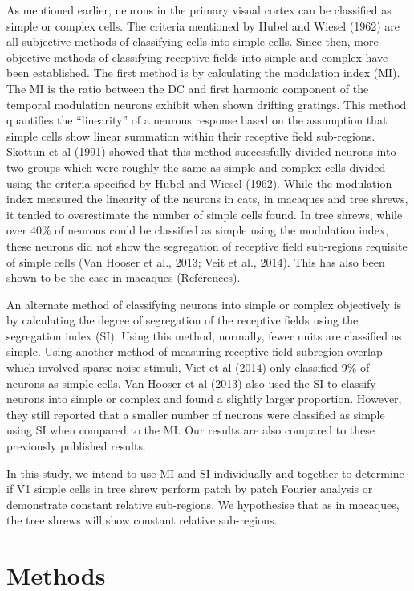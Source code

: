 	As mentioned earlier, neurons in the primary visual cortex can be classified as simple or complex cells. The criteria mentioned by Hubel and Wiesel (1962) are all subjective methods of classifying cells into simple cells. Since then, more objective methods of classifying receptive fields into simple and complex have been established. The first method is by calculating the modulation index (MI). The MI is the ratio between the DC and first harmonic component of the temporal modulation neurons exhibit when shown drifting gratings. This method quantifies the “linearity” of a neurons response based on the assumption that simple cells show linear summation within their receptive field sub-regions. Skottun et al (1991) showed that this method successfully divided neurons into two groups which were roughly the same as simple and complex cells divided using the criteria specified by Hubel and Wiesel (1962).
	While the modulation index measured the linearity of the neurons in cats, in macaques and tree shrews, it tended to overestimate the number of simple cells found. In tree shrews, while over 40\% of neurons could be classified as simple using the modulation index, these neurons did not show the segregation of receptive field sub-regions requisite of simple cells (Van Hooser et al., 2013; Veit et al., 2014). This has also been shown to be the case in macaques (References). 
	
	An alternate method of classifying neurons into simple or complex objectively is by calculating the degree of segregation of the receptive fields using the segregation index (SI). Using this method, normally, fewer units are classified as simple. Using another method of measuring receptive field subregion overlap which involved sparse noise stimuli, Viet et al (2014) only classified 9\% of neurons as simple cells. Van Hooser et al (2013) also used the SI to classify neurons into simple or complex and found a slightly larger proportion. However, they still reported that a smaller number of neurons were classified as simple using SI when compared to the MI. Our results are also compared to these previously published results.
	
	In this study, we intend to use MI and SI individually and together to determine if V1 simple cells in tree shrew perform patch by patch Fourier analysis or demonstrate constant relative sub-regions. We hypothesise that as in macaques, the tree shrews will show constant relative sub-regions.
	
	\section{Methods}
	
